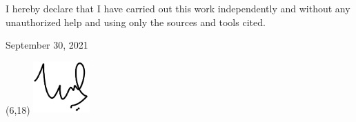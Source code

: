 \vspace*{\fill}

I hereby declare that I have carried out this work independently and without any unauthorized help and using only the sources and tools cited.

\vspace*{\fill}

September 30, 2021

\vspace*{\fill}
\begin{textblock}{10}(6,18)
\raggedleft\noindent\includegraphics[height=2cm]{images/sign.pdf}
\end{textblock}
\raggedleft{------------------------------- \\}

\vspace*{\fill}